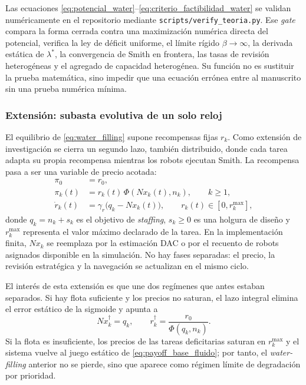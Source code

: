 Las ecuaciones \eqref{eq:potencial_water}--\eqref{eq:criterio_factibilidad_water} se
validan numéricamente en el repositorio mediante \texttt{scripts/verify\_teoria.py}.
Ese \emph{gate} compara la forma cerrada contra una maximización numérica directa del
potencial, verifica la ley de déficit uniforme, el límite rígido $\beta\to\infty$, la
derivada estática de $\lambda^*$, la convergencia de Smith en frontera, las tasas de
revisión heterogéneas y el agregado de capacidad heterogénea. Su función no es sustituir
la prueba matemática, sino impedir que una ecuación errónea entre al manuscrito sin una
prueba numérica mínima.

\subsubsection{Extensión: subasta evolutiva de un solo reloj}
\label{subsubsec:un_reloj}

El equilibrio de \eqref{eq:water_filling} supone recompensas fijas $r_k$. Como
extensión de investigación se cierra un segundo lazo, también distribuido, donde cada
tarea adapta su propia recompensa mientras los robots ejecutan Smith. La recompensa
pasa a ser una variable de precio acotada:
\begin{align}
  \pi_0 &= r_0, \label{eq:single_clock_idle}\\
  \pi_k(t) &= r_k(t)\,\Phi(Nx_k(t),n_k), \qquad k\ge 1, \label{eq:single_clock_payoff}\\
  \dot r_k(t) &= \gamma_r\bigl(q_k - Nx_k(t)\bigr),
  \qquad r_k(t)\in[0,r_k^{\max}], \label{eq:single_clock_price}
\end{align}
donde $q_k=n_k+s_k$ es el objetivo de \emph{staffing}, $s_k\ge0$ es una holgura de
diseño y $r_k^{\max}$ representa el valor máximo declarado de la tarea. En la
implementación finita, $Nx_k$ se reemplaza por la estimación DAC o por el recuento de
robots asignados disponible en la simulación. No hay fases separadas: el precio, la
revisión estratégica y la navegación se actualizan en el mismo ciclo.

El interés de esta extensión es que une dos regímenes que antes estaban separados. Si
hay flota suficiente y los precios no saturan, el lazo integral elimina el error estático
de la sigmoide y apunta a
\begin{equation}
  Nx_k^\dagger = q_k,\qquad
  r_k^\dagger = \frac{r_0}{\Phi(q_k,n_k)} .
  \label{eq:single_clock_exact_staffing}
\end{equation}
Si la flota es insuficiente, los precios de las tareas deficitarias saturan en
$r_k^{\max}$ y el sistema vuelve al juego estático de
\eqref{eq:payoff_base_fluido}; por tanto, el \emph{water-filling} anterior no se pierde,
sino que aparece como régimen límite de degradación por prioridad.

